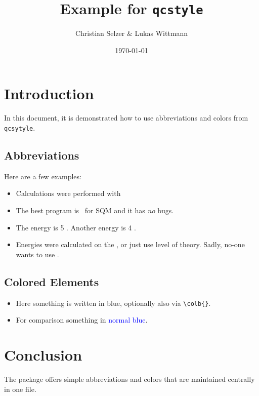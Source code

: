 \documentclass[a4paper,12pt]{article}
\title{Example for \texttt{qcstyle}}
\author{Christian Selzer \& Lukas Wittmann}
\date{\today}
\begin{document}
\maketitle

\section{Introduction}

    In this document, it is demonstrated how to use abbreviations and colors from \texttt{qcsytyle}.

\subsection{Abbreviations}
    Here are a few examples:
    \begin{itemize}
      \item Calculations were performed with \orca\
      \item The best program is \xtb\ for SQM and it has \emph{no} bugs.
      \item The energy is 5 \kcalpmol. Another energy is 4 \kjpmol.
      \item Energies were calculated on the \method{r2scan3c}, or just use  level of theory. Sadly, no-one wants to use .
    \end{itemize}

\subsection{Colored Elements}
    \begin{itemize}
        \item Here something is written in \textcolor{bonnblue}{blue}, optionally also via \verb|\colb{}|.
        \item For comparison something in \textcolor{blue}{normal blue}.
    \end{itemize}


\section{Conclusion}
    The package offers simple abbreviations and colors that are maintained centrally in one file.
\end{document}
